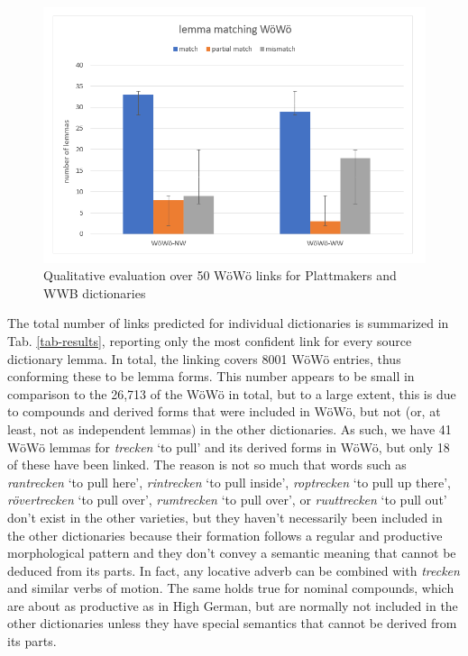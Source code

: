 \documentclass[11pt]{article}
\newcommand{\word}[1]{\textsl{#1}} %
\begin{document}
\begin{figure}
    \centering
    \includegraphics[width=1\linewidth]{lemma-matching-woewoe.png}
    \caption{Qualitative evaluation over 50 WöWö links for Plattmakers and WWB dictionaries}
    \label{fig-eval}
\end{figure}


The total number of links predicted for individual dictionaries is summarized in Tab. \ref{tab-results}, reporting only the most confident link for every source dictionary lemma.
In total, the linking covers 8001 WöWö entries, thus conforming these to be lemma forms. This number appears to be small in comparison to the 26,713 of the WöWö in total, but to a large extent, this is due to compounds and derived forms that were included in WöWö, but not (or, at least, not as independent lemmas) in the other dictionaries. As such, we have 41 WöWö lemmas for \word{trecken} `to pull' and its derived forms in WöWö, but only 18 of these have been linked. The reason is not so much that words such as \word{rantrecken} `to pull here', \word{rintrecken} `to pull inside', \word{roptrecken} `to pull up there', \word{rövertrecken} `to pull over', \word{rumtrecken} `to pull over', or \word{ruuttrecken} `to pull out' don't exist in the other varieties, but they haven't necessarily been included in the other dictionaries because their formation follows a regular and productive morphological pattern and they don't convey a semantic meaning that cannot be deduced from its parts. In fact, any locative adverb can be combined with \word{trecken} and similar verbs of motion. The same holds true for nominal compounds, which are about as productive as in High German, but are normally not included in the other dictionaries unless they have special semantics that cannot be derived from its parts.
\end{document}

